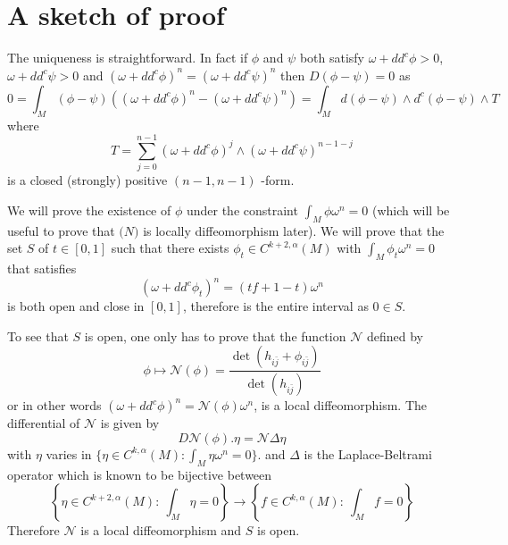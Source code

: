 \documentclass[11pt]{article}
\begin{document}
\section{A sketch of proof}
\label{sec:org351f259}
The uniqueness is straightforward. In fact if \(\phi\) and \(\psi\)
both satisfy \(\omega + dd^c\phi >0\), \(\omega + dd^c \psi >0\) and \((\omega + dd^c\phi)^n = (\omega +
dd^c\psi)^n\) then \(D(\phi - \psi) = 0\) as \[ 0 = \int_M (\phi - \psi)((\omega + dd^c\phi)^n -
(\omega + dd^c\psi)^n) = \int_M d(\phi -\psi)\wedge d^c (\phi -\psi) \wedge T \] where 
\[ 
T =\sum_{j=0}^{n-1}(\omega + dd^c\phi)^j\wedge (\omega + dd^c\psi)^{n-1-j} 
\] 
is a closed (strongly)
positive \((n-1,n-1)\) -form.





We will prove the existence of \(\phi\) under the constraint
\(\int_M\phi\omega^n = 0\) (which will be useful to prove that \(\mathcal(N)\) is locally diffeomorphism
later). We will prove that the set \(S\) of \(t\in [0,1]\) such that there exists \(\phi_t\in
C^{k+2,\alpha}(M)\) with \(\int_M \phi_t\omega^n = 0\) that satisfies
\begin{equation}
\label{eq:omega-convex-t}
(\omega + dd^c\phi_t)^n = (tf + 1-t)\omega^n
\end{equation}
is both open and close in \([0,1]\), therefore is the entire interval as \(0\in S\).

To see that \(S\) is open, one only has to prove that the function \(\mathcal{N}\) defined by
\[
\phi\mapsto \mathcal{N}(\phi)= \frac{\det(h_{i\bar j} + \phi_{i\bar j})}{\det(h_{i\bar j})}
\]
or in other words \((\omega + dd^c\phi)^n = \mathcal{N}(\phi)\omega^n\), is a local
diffeomorphism. The differential of \(\mathcal{N}\) is given by
\[
D \mathcal{N}(\phi).\eta = \mathcal{N}\Delta\eta
\]
with \(\eta\) varies in \(\{\eta\in C^{k,\alpha}(M):\int_M\eta\omega^n=0\}\). and \(\Delta\) is the
Laplace-Beltrami operator which is known to be bijective between
\[
\left\{\eta\in C^{k+2,\alpha}(M):\ \int_M\eta = 0\right\} \longrightarrow \left\{f\in C^{k,\alpha}(M):\ \int_M f=0\right\}
\]
Therefore \(\mathcal{N}\) is a local diffeomorphism and \(S\) is open.
\end{document}
